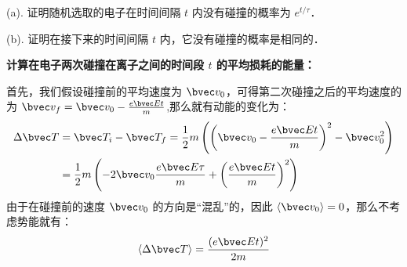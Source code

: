 \begin{example}{}
(a). 证明随机选取的电子在时间间隔 $t$ 内没有碰撞的概率为 $e^{t/\tau}$．

(b). 证明在接下来的时间间隔 $t$ 内，它没有碰撞的概率是相同的．
\end{example}
\begin{example}{}
\textbf{计算在电子两次碰撞在离子之间的时间段 $t$ 的平均损耗的能量：}

首先，我们假设碰撞前的平均速度为 $\bvec v_0$，可得第二次碰撞之后的平均速度的为 $\bvec v_f=\bvec v_0 -\frac{e\bvec E t}{m}$,那么就有动能的变化为：
\begin{align}
\Delta \bvec T &= \bvec T_i-\bvec T_f=\frac{1}{2}m\left(\left(\bvec v_0 -\frac{e\bvec E t}{m}\right)^2-\bvec v_0^2\right)\\
&=\frac{1}{2}m\left(-2\bvec v_0\frac{e\bvec E \tau}{m}+\left(\frac{e\bvec E t}{m}\right)^2\right)\\
\end{align}
由于在碰撞前的速度 $\bvec v_0$ 的方向是“混乱”的，因此 $\langle \bvec v_0\rangle = 0$，那么不考虑势能就有：
\begin{equation}
\langle \Delta \bvec T \rangle = \frac{(e\bvec E t)^2}{2m}
\end{equation}
\end{example}

